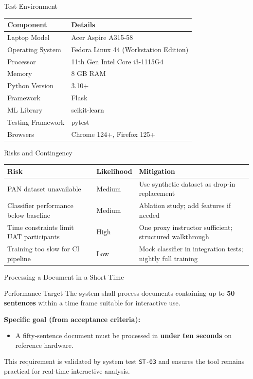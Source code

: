 \documentclass[compress,aspectratio=169]{beamer}
\begin{document}
\begin{frame}{Test Environment}
    \centering
    \footnotesize
    \begin{tabular}{p{3.5cm} p{7.5cm}}
    \toprule
    \textbf{Component} & \textbf{Details}\\
    \midrule
    Laptop Model & Acer Aspire A315-58\\
    Operating System & Fedora Linux 44 (Workstation Edition)\\
    Processor & 11th Gen Intel Core i3-1115G4\\
    Memory & 8 GB RAM\\
    Python Version & 3.10+\\
    Framework & Flask\\
    ML Library & scikit-learn\\
    Testing Framework & pytest\\
    Browsers & Chrome 124+, Firefox 125+\\
    \bottomrule
    \end{tabular}
\end{frame}

\begin{frame}{Risks and Contingency}
    \centering
    \footnotesize
    \begin{tabular}{p{3.5cm} p{1.5cm} p{6.0cm}}
    \toprule
    \textbf{Risk} & \textbf{Likelihood} & \textbf{Mitigation}\\
    \midrule
    PAN dataset unavailable & Medium & Use synthetic dataset as drop‑in replacement\\
    Classifier performance below baseline & Medium & Ablation study; add features if needed\\
    Time constraints limit UAT participants & High & One proxy instructor sufficient; structured walkthrough\\
    Training too slow for CI pipeline & Low & Mock classifier in integration tests; nightly full training\\
    \bottomrule
    \end{tabular}
\end{frame}

\begin{frame}{Processing a Document in a Short Time}
    \centering
    \begin{block}{Performance Target}
        The system shall process documents containing up to \textbf{50 sentences} within a time frame suitable for interactive use.
    \end{block}
    \vspace{0.3cm}
    \textbf{Specific goal (from acceptance criteria):}
    \begin{itemize}
        \item A fifty‑sentence document must be processed in \textbf{under ten seconds} on reference hardware.
    \end{itemize}
    \vspace{0.3cm}
    \footnotesize
    This requirement is validated by system test \texttt{ST-03} and ensures the tool remains practical for real‑time interactive analysis.
\end{frame}
\end{document}
